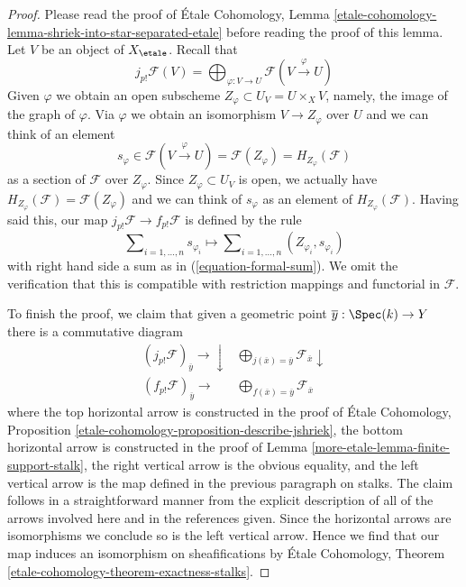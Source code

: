 \begin{proof}
Please read the proof of \'Etale Cohomology, Lemma
\ref{etale-cohomology-lemma-shriek-into-star-separated-etale}
before reading the proof of this lemma.
Let $V$ be an object of $X_\etale$. Recall that
$$
j_{p!}\mathcal{F}(V) =
\bigoplus\nolimits_{\varphi : V \to U} \mathcal{F}(V \xrightarrow{\varphi} U)
$$
Given $\varphi$ we obtain an open subscheme
$Z_\varphi \subset U_V = U \times_X V$, namely,
the image of the graph of $\varphi$. Via $\varphi$
we obtain an isomorphism $V \to Z_\varphi$ over $U$
and we can think of an element
$$
s_\varphi \in \mathcal{F}(V \xrightarrow{\varphi} U) =
\mathcal{F}(Z_\varphi) = H_{Z_\varphi}(\mathcal{F})
$$
as a section of $\mathcal{F}$ over $Z_{\varphi}$. Since
$Z_\varphi \subset U_V$ is open, we actually have
$H_{Z_\varphi}(\mathcal{F}) = \mathcal{F}(Z_\varphi)$
and we can think of $s_\varphi$ as an element of $H_{Z_\varphi}(\mathcal{F})$.
Having said this, our map $j_{p!}\mathcal{F} \to f_{p!}\mathcal{F}$
is defined by the rule
$$
\sum\nolimits_{i = 1, \ldots, n} s_{\varphi_i}
\longmapsto
\sum\nolimits_{i = 1, \ldots, n} (Z_{\varphi_i}, s_{\varphi_i})
$$
with right hand side a sum as in (\ref{equation-formal-sum}).
We omit the verification that this is compatible with restriction
mappings and functorial in $\mathcal{F}$.

\medskip\noindent
To finish the proof, we claim that given a geometric point
$\overline{y} : \Spec(k) \to Y$ there is a commutative diagram
$$
\begin{array}{cc}(j_{p!}\mathcal{F})_{\overline{y}} \longrightarrow\downarrow & \bigoplus_{j(\overline{x}) = \overline{y}} \mathcal{F}_{\overline{x}}
\downarrow \\ (f_{p!}\mathcal{F})_{\overline{y}} \longrightarrow & \bigoplus_{f(\overline{x}) = \overline{y}} \mathcal{F}_{\overline{x}}\end{array}
$$
where the top horizontal arrow is constructed in the proof of
\'Etale Cohomology, Proposition
\ref{etale-cohomology-proposition-describe-jshriek},
the bottom horizontal arrow is constructed in the proof of
Lemma \ref{more-etale-lemma-finite-support-stalk},
the right vertical arrow is the obvious equality, and
the left vertical arrow is the map defined in the previous
paragraph on stalks. The claim follows in a straightforward manner
from the explicit description of all of the arrows involved
here and in the references given.
Since the horizontal arrows are isomorphisms
we conclude so is the left vertical arrow. Hence we find that
our map induces an isomorphism on sheafifications by
\'Etale Cohomology, Theorem \ref{etale-cohomology-theorem-exactness-stalks}.
\end{proof}

